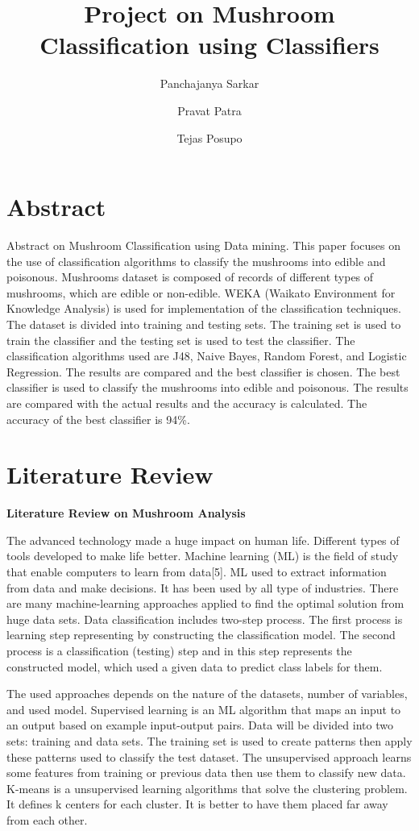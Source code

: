 \documentclass[a4paper,11pt]{article}
\title{Project on Mushroom Classification using Classifiers}
\author[a]{Panchajanya Sarkar}
\author[b]{Pravat Patra}
\author[c]{Tejas Posupo}
\affiliation[*]{Central University of Rajasthan,\\
  NH-8, Ajmer, 305817, India}
\begin{document}
    \maketitle
        \section{Abstract}
            Abstract on Mushroom Classification using Data mining.
            This paper focuses on the use of classification algorithms to classify the mushrooms into edible and poisonous. Mushrooms dataset is composed of records of different types of mushrooms, which are edible or non-edible. WEKA (Waikato Environment for Knowledge Analysis) is used for implementation of the classification techniques. The dataset is divided into training and testing sets. The training set is used to train the classifier and the testing set is used to test the classifier. The classification algorithms used are J48, Naive Bayes, Random Forest, and Logistic Regression. The results are compared and the best classifier is chosen. The best classifier is used to classify the mushrooms into edible and poisonous. The results are compared with the actual results and the accuracy is calculated. The accuracy of the best classifier is 94\%.
        \section{Literature Review}
            \textbf{Literature Review on Mushroom Analysis}

            The advanced technology made a huge impact on human life. Different types of tools developed to make life better.  Machine learning (ML) is the field of study that enable computers to learn from data[5]. ML used to extract information from data and make decisions. It has been used by all type of industries. There are many machine-learning approaches applied to find the optimal solution from huge data sets. Data classification includes two-step process. The first process is learning step representing by constructing the classification model. The second process is a classification (testing) step and in this step represents the constructed model, which used a given data to predict class labels for them.  
            
            The used  approaches depends on the nature of the datasets, number of variables,  and used model.  Supervised learning  is an ML algorithm that maps an input to an output based on example input-output pairs.  Data will be divided into two sets: training and data sets. The training set is used to create patterns then apply these patterns used to classify the test dataset. The unsupervised approach learns some features from training or previous data then use them to classify new data. K-means is a unsupervised learning algorithms that solve the clustering problem. It defines k centers for each cluster. It is better to have them placed far away from each other.  
            
\end{document}
